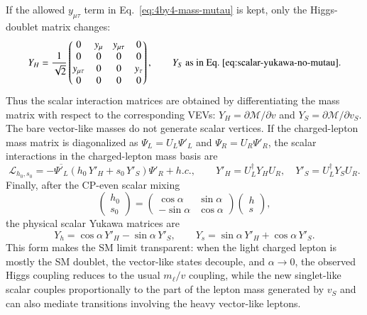 \documentclass[onecolumn, aps, nofootinbib, prd, preprint, floats, floatfix, amsmath, amssymb, superscriptaddress, preprintnumbers]{revtex4-1}
\begin{document}
If the allowed $y_{\mu\tau}$ term in Eq.~\eqref{eq:4by4-mass-mutau} is kept, only the Higgs-doublet matrix changes:
\begin{equation}
Y_H=\frac{1}{\sqrt2}
\begin{pmatrix}
0&y_\mu&y_{\mu\tau}&0\\
0&0&0&0\\
y_{\mu\tau}&0&0&y_\tau\\
0&0&0&0
\end{pmatrix},
\qquad
Y_S\ \text{as in Eq.~\eqref{eq:scalar-yukawa-no-mutau}} .
\label{eq:scalar-yukawa-mutau}
\end{equation}
Thus the scalar interaction matrices are obtained by differentiating the mass matrix with respect to the corresponding VEVs: $Y_H=\partial\mathcal{M}/\partial v$ and $Y_S=\partial\mathcal{M}/\partial v_S$. The bare vector-like masses do not generate scalar vertices. If the charged-lepton mass matrix is diagonalized as $\Psi_L=U_L\Psi'_L$ and $\Psi_R=U_R\Psi'_R$, the scalar interactions in the charged-lepton mass basis are
\begin{equation}
\mathcal{L}_{h_0,s_0}
=-\overline{\Psi'_L}\left(h_0\,Y'_H+s_0\,Y'_S\right)\Psi'_R+h.c.,
\qquad
Y'_H=U_L^\dagger Y_HU_R,\quad
Y'_S=U_L^\dagger Y_SU_R .
\label{eq:full-scalar-yukawa-mass}
\end{equation}
Finally, after the CP-even scalar mixing
\begin{equation}
\begin{pmatrix}
h_0\\
s_0
\end{pmatrix}
=
\begin{pmatrix}
\cos\alpha&\sin\alpha\\
-\sin\alpha&\cos\alpha
\end{pmatrix}
\begin{pmatrix}
h\\
s
\end{pmatrix},
\end{equation}
the physical scalar Yukawa matrices are
\begin{equation}
Y_h=\cos\alpha\,Y'_H-\sin\alpha\,Y'_S,
\qquad
Y_s=\sin\alpha\,Y'_H+\cos\alpha\,Y'_S .
\label{eq:physical-full-scalar-yukawa}
\end{equation}
This form makes the SM limit transparent: when the light charged lepton is mostly the SM doublet, the vector-like states decouple, and $\alpha\to0$, the observed Higgs coupling reduces to the usual $m_\ell/v$ coupling, while the new singlet-like scalar couples proportionally to the part of the lepton mass generated by $v_S$ and can also mediate transitions involving the heavy vector-like leptons.
\end{document}
